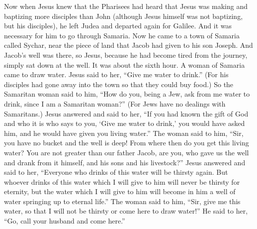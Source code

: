 \begin{biblechapter} %
 Now when Jesus knew that the Pharisees had heard that Jesus was making and baptizing more disciples than John
\verse (although Jesus himself was not baptizing, but his disciples),
\verse he left Judea and departed again for Galilee.
\verse And it was necessary for him to go through Samaria.
\verse Now he came to a town of Samaria called Sychar, near the piece of land that Jacob had given to his son Joseph.
\verse And Jacob’s well was there, so Jesus, because he had become tired from the journey, simply sat down at the well. It was about the sixth hour.
\verse A woman of Samaria came to draw water. Jesus said to her, “Give me water to drink.”
\verse (For his disciples had gone away into the town so that they could buy food.)
\verse So the Samaritan woman said to him, “How do you, being a Jew, ask from me water to drink, since I am a Samaritan woman?” (For Jews have no dealings with Samaritans.)
\verse Jesus answered and said to her, “If you had known the gift of God and who it is who says to you, ‘Give me water to drink,’ you would have asked him, and he would have given you living water.”
\verse The woman said to him, “Sir, you have no bucket and the well is deep! From where then do you get this living water?
\verse You are not greater than our father Jacob, are you, who gave us the well and drank from it himself, and his sons and his livestock?”
\verse Jesus answered and said to her, “Everyone who drinks of this water will be thirsty again.
\verse But whoever drinks of this water which I will give to him will never be thirsty for eternity, but the water which I will give to him will become in him a well of water springing up to eternal life.”
\verse The woman said to him, “Sir, give me this water, so that I will not be thirsty or come here to draw water!”
\verse He said to her, “Go, call your husband and come here.”

\end{biblechapter}
